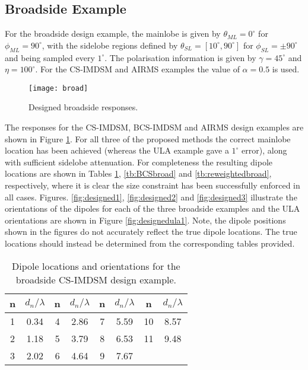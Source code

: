 \documentclass[10pt,final]{IEEEtran}
\begin{document}
\subsection{Broadside Example}
For the broadside design example, the mainlobe is given by $\theta_{ML}=0^{\circ}$ for
$\phi_{ML}=90^{\circ}$, with the sidelobe regions defined by $\theta_{SL}=[10^{\circ},90^{\circ}]$ for
$\phi_{SL}=\pm90^{\circ}$ and being sampled every $1^{\circ}$.  The polarisation information is given by
$\gamma=45^{\circ}$ and $\eta=100^{\circ}$.  For the CS-IMDSM and AIRMS examples the value of $\alpha=0.5$
is used.
\begin{figure}
\begin{center}
   \texttt{[image: broad]}
   \caption{Designed broadside responses.
    \label{fig:broad}}
\end{center}
\end{figure}

The responses for the CS-IMDSM, BCS-IMDSM and AIRMS design examples are shown in Figure \ref{fig:broad}.  For all three of the proposed methods the correct mainlobe location has been achieved (whereas the ULA example gave a $1^{\circ}$ error), along with sufficient sidelobe attenuation.  For completeness the resulting dipole locations are shown in Tables \ref{tb:CSbroad}, \ref{tb:BCSbroad} and \ref{tb:reweightedbroad}, respectively, where it is clear the size constraint has been successfully enforced in all cases.  Figures. \ref{fig:designed1}, \ref{fig:designed2} and \ref{fig:designed3} illustrate the orientations of the dipoles for each of the three broadside examples and the ULA orientations are shown in Figure \ref{fig:designedula1}.  Note, the dipole positions shown in the figures do not accurately reflect the true dipole locations.  The true locations should instead be determined from the corresponding tables provided.


\begin{table}
\caption{\rm Dipole locations and orientations for the broadside CS-IMDSM design example.} \centering
\begin{tabular}{|c|c|c|c|c|c|c|c|}\hline
n  & $d_{n}/\lambda$ &  n & $d_{n}/\lambda$ &  n & $d_{n}/\lambda$ & n & $d_{n}/\lambda$\\
\hline
1  &  0.34  &  4 &  2.86    &  7 &  5.59  & 10 & 8.57 \\
\hline
2  & 1.18 &  5  &   3.79   &  8 &  6.53  & 11 & 9.48 \\
\hline
3  & 2.02 &   6  &   4.64  &  9 &  7.67   \\
\cline{1-6}

\end{tabular}
\label{tb:CSbroad}
\end{table}
\end{document}
